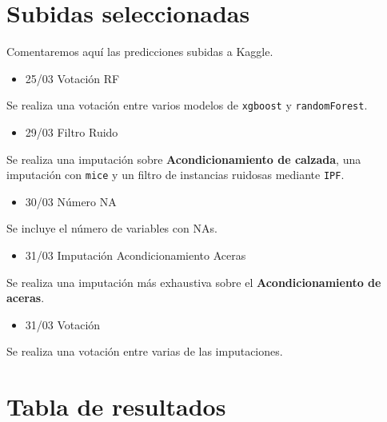 \documentclass[11pt]{article}
\begin{document}
\section{Subidas seleccionadas}
\label{sec:org4bd5607}

Comentaremos aquí las predicciones subidas a Kaggle. 

\begin{itemize}
\item 25/03 Votación RF
\end{itemize}

Se realiza una votación entre varios modelos de \texttt{xgboost} y
\texttt{randomForest}.

\begin{itemize}
\item 29/03 Filtro Ruido
\end{itemize}

Se realiza una imputación sobre \textbf{Acondicionamiento de calzada}, una
imputación con \texttt{mice} y un filtro de instancias ruidosas mediante
\texttt{IPF}.

\begin{itemize}
\item 30/03 Número NA
\end{itemize}

Se incluye el número de variables con NAs.

\begin{itemize}
\item 31/03 Imputación Acondicionamiento Aceras
\end{itemize}

Se realiza una imputación más exhaustiva sobre el \textbf{Acondicionamiento
de aceras}.

\begin{itemize}
\item 31/03 Votación
\end{itemize}

Se realiza una votación entre varias de las imputaciones.

\section{Tabla de resultados}
\label{sec:org7b51606}
\end{document}
